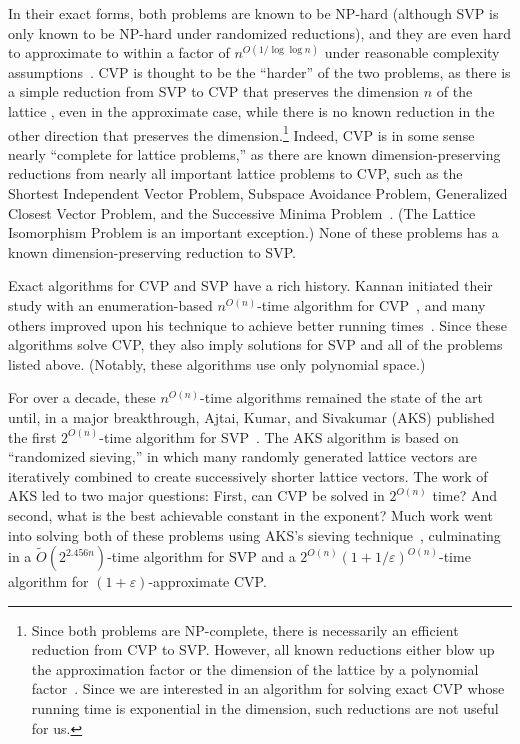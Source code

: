 \documentclass[11pt]{article}
\newcommand{\eps}{\varepsilon}
\newcommand{\problem}[1]{\mbox{#1}\xspace}
\newcommand{\scarequotes}[1]{``#1''}
\begin{document}
In their exact forms, both problems are known to be NP-hard (although SVP is only known to be NP-hard under randomized reductions), and they are even hard to approximate to within a factor of $n^{O(1/\log \log n)}$ under reasonable complexity assumptions~\cite{ABSS93,Ajt98,CN98,BS99,DKRS03,Mic01svp,Khot05svp,HRsvp}. \problem{CVP} is thought to be the \scarequotes{harder} of the two problems, as there is a simple reduction from \problem{SVP} to \problem{CVP} that preserves the dimension $n$ of the lattice \cite{GMSS99}, even in the approximate case, while there is no known reduction in the other direction that preserves the dimension.\footnote{Since both problems are NP-complete, there is necessarily an efficient reduction from \problem{CVP} to \problem{SVP}. However, all known reductions either blow up the approximation factor or the dimension of the lattice by a polynomial factor~\cite{Kan87,DH11}. Since we are interested in an algorithm for solving exact CVP whose running time is exponential in the dimension, such reductions are not useful for us.} Indeed, \problem{CVP} is in some sense nearly \scarequotes{complete for lattice problems,} as there are known dimension-preserving reductions from nearly all important lattice problems to \problem{CVP}, 
such as the Shortest Independent Vector Problem, Subspace Avoidance Problem, Generalized Closest Vector Problem, and the Successive Minima Problem~\cite{Micciancio08}. (The Lattice Isomorphism Problem is an important exception.) None of these problems has a known dimension-preserving reduction to \problem{SVP}.

Exact algorithms for \problem{CVP} and \problem{SVP} have a rich history. Kannan initiated their study with an enumeration-based $n^{O(n)}$-time algorithm for \problem{CVP}~\cite{Kan87}, and many others improved upon his technique to achieve better running times~\cite{Helfrich86,HanrotStehle07,MicciancioWalter15}. Since these algorithms solve \problem{CVP}, they also imply solutions for \problem{SVP} and all of the problems listed above. (Notably, these algorithms use only polynomial space.)

For over a decade, these $n^{O(n)}$-time algorithms remained the state of the art until, in a major breakthrough, Ajtai, Kumar, and Sivakumar (AKS) published the first $2^{O(n)}$-time algorithm for \problem{SVP}~\cite{AKS01}. The AKS algorithm is based on \scarequotes{randomized sieving,} in which many randomly generated lattice vectors are iteratively combined to create successively shorter lattice vectors. The work of AKS led to two major questions: First, can \problem{CVP} be solved in $2^{O(n)}$ time? And second, what is the best achievable constant in the exponent? Much work went into solving both of these problems using AKS's sieving technique~\cite{AKS01,AKS02,NguyenVidick08,AJ08,BN09,PS09,MV10,HPS11}, culminating in a $\widetilde{O}(2^{2.456 n})$-time algorithm for \problem{SVP} and a $2^{O(n)}  (1+1/\eps)^{O(n)}$-time algorithm for $(1+\eps)$-approximate \problem{CVP}.
\end{document}
